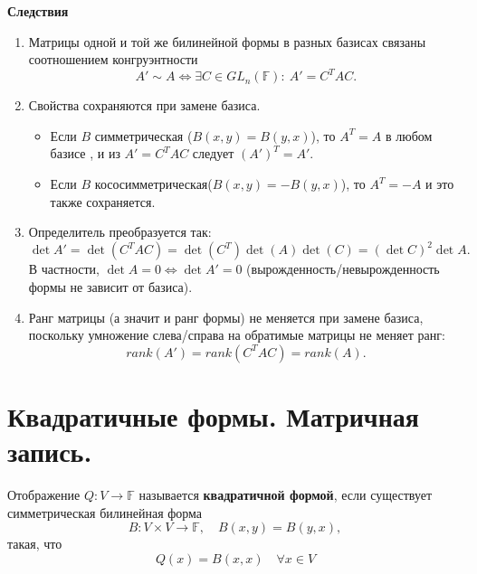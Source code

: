 \documentclass[14pt]{extreport}
\begin{document}
    \begin{defbox}
        \textbf{Следствия}
        \begin{enumerate}
            \item Матрицы одной и той же билинейной формы в разных базисах связаны соотношением конгруэнтности
            \[
            A' \sim A \Leftrightarrow \exists C \in GL_n(\mathbb{F}):\ A' = C^TAC.
            \]
            
            \item Свойства сохраняются при замене базиса.
            \begin{itemize}
                \item Если $B$ симметрическая ($B(x,y) = B(y,x)$), то $A^T = A$ в любом базисе , и из $A' = C^TAC$ следует $(A')^T = A'$.
                \item Если $B$ кососимметрическая($B(x,y) = -B(y,x)$), то $A^T = -A$ и это также сохраняется.
            \end{itemize}

            \item Определитель преобразуется так:
            \[
            \det A' = \det(C^TAC) = \det(C^T) \det(A) \det(C) = (\det C)^2 \det A.
            \]
            В частности, $\det A = 0 \Leftrightarrow \det A' = 0$ (вырожденность/невырожденность формы не зависит от базиса).

            \item Ранг матрицы (а значит и ранг формы) не меняется при замене базиса, поскольку умножение слева/справа на обратимые матрицы не меняет ранг:
            \[
            rank(A') = rank(C^TAC) = rank(A).
            \]
        \end{enumerate}
    \end{defbox}



    \chapter{Квадратичные формы. Матричная запись.}

    \begin{defbox}
        Отображение $Q: V \rightarrow \mathbb{F}$ называется \textbf{квадратичной формой}, если существует симметрическая билинейная форма
        \[
        B: V \times V \rightarrow \mathbb{F}, \quad B(x,y) = B(y,x),
        \]
        такая, что
        \[
        Q(x) = B(x,x) \quad \forall x \in V
        \]
    \end{defbox}
\end{document}
